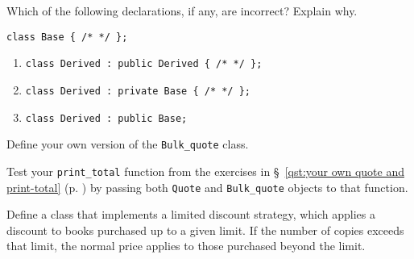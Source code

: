 %
%
\begin{question}
Which of the following declarations, if any, are incorrect?
Explain why.
\begin{lstlisting}
class Base { /* */ };
\end{lstlisting}
\begin{enumerate}[label=(\alph*)]
^^I\item \verb|class Derived : public Derived { /* */ };|
^^I\item \verb|class Derived : private Base { /* */ };|
^^I\item \verb|class Derived : public Base;|
\end{enumerate}
\end{question}

\begin{question}
Define your own version of the \verb|Bulk_quote| class.
\end{question}

\begin{question}
Test your \verb|print_total| function from the exercises in
\S~\ref{qst:your own quote and print-total} (p. \pageref{qst:your own quote and print-total}) by passing both \verb|Quote| and \verb|Bulk_quote| objects to that
function.
\end{question}

\begin{question}\label{qst:define a class  with limited discount strategy}
Define a class that implements a limited discount strategy,
which applies a discount to books purchased up to a given limit. If the
number of copies exceeds that limit, the normal price applies to those
purchased beyond the limit.
\end{question}
